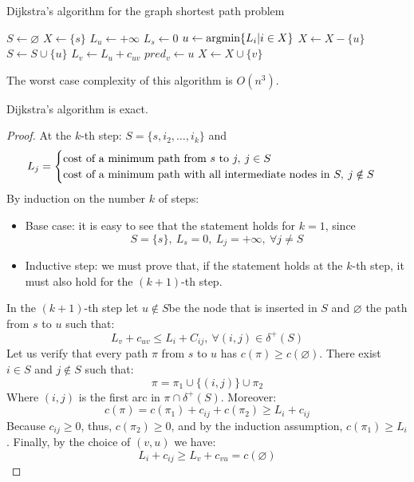 \documentclass[12pt, a4paper]{report}
\newtheorem[style=M,bodystyle=\normalfont]{theorem}{Theorem}
\newtheorem[style=M,bodystyle=\normalfont]{corollary}{Corollary}
\newtheorem[style=M,bodystyle=\normalfont]{lemma}{Lemma}
\newtheorem[style=M,bodystyle=\normalfont]{definition}{Definition}
\begin{document}
    \begin{algorithm}[H]
        \caption{Dijkstra's algorithm for the graph shortest path problem}
            \begin{algorithmic}[1]
                \State $S \leftarrow \varnothing$
                \State $X \leftarrow \{s\}$
                    \State $L_u \leftarrow +\infty$
                \EndFor
                \State $L_s \leftarrow 0$
                    \State $u \leftarrow \textnormal{argmin}\{L_i|i \in X\}$
                    \State $X \leftarrow X-\{u\}$
                    \State $S \leftarrow S \cup \{u\}$
                        \State $L_v \leftarrow L_u+c_{uv}$
                        \State $pred_v \leftarrow u$
                        \State $X \leftarrow X \cup \{v\}$
                    \EndFor
                \EndWhile
            \end{algorithmic}
    \end{algorithm}
    The worst case complexity of this algorithm is $O(n^3)$. 
    \begin{example}[Proposition]
        Dijkstra's algorithm is exact. 
    \end{example}
    \begin{proof}
        At the $k$-th step: $S = \{s,i_2,\dots,i_k\}$ and 
        \[L_j=
        \begin{cases}
            \textnormal{cost of a minimum path from } s \textnormal{ to } j,\:j \in S \\ 
            \textnormal{cost of a minimum path with all intermediate nodes in } S, \: j \notin S
        \end{cases}
        \]
        By induction on the number $k$ of steps: 
        \begin{itemize}
            \item Base case: it is easy to see that the statement holds for $k = 1$, since 
                \[S=\{s\},\: L_s=0,\: L_j= +\infty,\: \forall j \neq S \]
            \item Inductive step: we must prove that, if the statement holds at the $k$-th step, it must also hold for the $(k + 1)$-th step. 
        \end{itemize}
        In the $(k + 1)$-th step let $u \notin S$be the node that is inserted in $S$ and $\varnothing$ the path from $s$ to $u$ such that:
        \[L_v + c_{uv} \leq L_i + C_{ij},\: \forall(i,j) \in \delta^{+}(S)\]
        Let us verify that every path $\pi$ from $s$ to $u$ has $c(\pi) \geq c(\varnothing)$. There exist $i \in S$ and $j \notin S$ such that: 
        \[\pi= \pi_1 \cup \{(i,j)\} \cup \pi_2\]
        Where $(i, j)$ is the first arc in $\pi \cap \delta^{+}(S)$. Moreover: 
        \[c(\pi) = c(\pi_1) + c_{ij} + c(\pi_2) \geq L_i + c_{ij}\]
        Because $c_{ij} \geq 0$, thus, $c(\pi_2) \geq 0$, and by the induction assumption, $c(\pi_1) \geq L_i$. Finally, by the choice of $(v,u)$ we have: 
        \[L_i + c_{ij} \geq L_v + c_{vu} = c(\varnothing)\]
    \end{proof}
\end{document}
